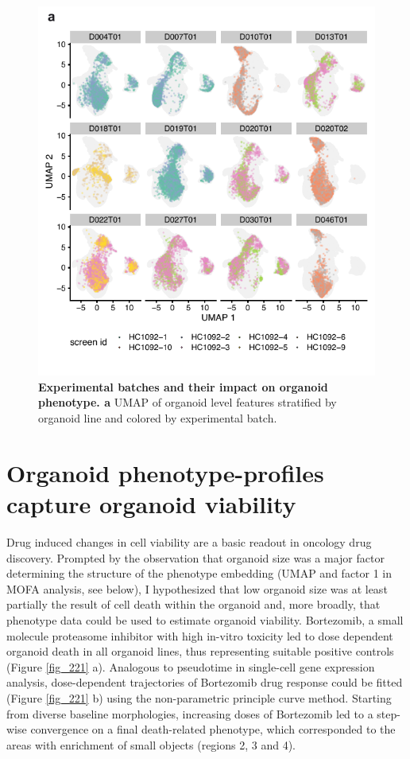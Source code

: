 \begin{flushleft}
\bigbreak

\begin{figure}[h]
\centering
\includegraphics[width=\textwidth,
                height=\textheight,
                keepaspectratio]{figures/promise/pdf/fig_1_6.pdf}
\caption{\textbf{Experimental batches and their impact on organoid phenotype. a} UMAP of organoid level features stratified by organoid line and colored by experimental batch.}
\label{fig_216}
\end{figure}
\clearpage


\section{Organoid phenotype-profiles capture organoid viability}

Drug induced changes in cell viability are a basic readout in oncology drug discovery. Prompted by the observation that organoid size was a major factor determining the structure of the phenotype embedding (UMAP and factor 1 in MOFA analysis, see below), I hypothesized that low organoid size was at least partially the result of cell death within the organoid and, more broadly, that phenotype data could be used to estimate organoid viability. Bortezomib, a small molecule proteasome inhibitor with high in-vitro toxicity led to dose dependent organoid death in all organoid lines, thus representing suitable positive controls (Figure \ref{fig_221} a). Analogous to pseudotime in single-cell  gene expression analysis, dose-dependent trajectories of Bortezomib drug response could be fitted (Figure \ref{fig_221} b) using the non-parametric principle curve method. Starting from diverse baseline morphologies, increasing doses of Bortezomib led to a step-wise convergence on a final death-related phenotype, which corresponded to the areas with enrichment of small objects (regions 2, 3 and 4). 


\end{flushleft}
